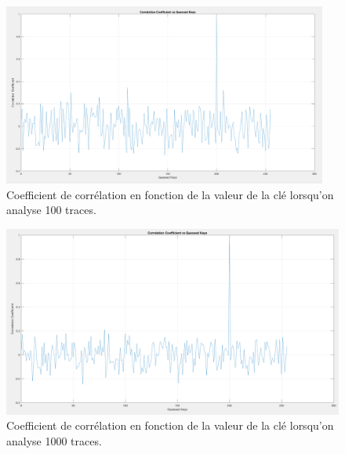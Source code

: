 \documentclass[10pt, oneside, a4paper]{article}
\begin{document}
\begin{figure}[htbp]
    \centering
    \includegraphics[width=0.95\textwidth]{image/100}    \caption{Coefficient de corrélation en fonction de la valeur de la clé lorsqu'on analyse 100 traces.}    \label{fig:100}
\end{figure}

\begin{figure}[htbp]
    \centering
    \includegraphics[width=1.05\textwidth]{image/1000}    \caption{Coefficient de corrélation en fonction de la valeur de la clé lorsqu'on analyse 1000 traces.}    \label{fig:1000}
\end{figure}

\newpage
\end{document}
